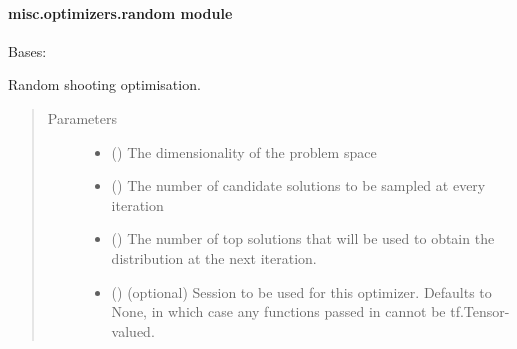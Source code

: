 \documentclass[letterpaper,10pt,english,openany,oneside]{sphinxmanual}
\begin{document}
\paragraph{misc.optimizers.random module}
\label{\detokenize{_modules/misc.optimizers:module-misc.optimizers.random}}\label{\detokenize{_modules/misc.optimizers:misc-optimizers-random-module}}

\begin{fulllineitems}
\label{\detokenize{_modules/misc.optimizers:misc.optimizers.random.RandomOptimizer}}
Bases: {\hyperref[\detokenize{_modules/misc.optimizers:misc.optimizers.optimizer.Optimizer}]{}}

Random shooting optimisation.
\begin{quote}\begin{description}
\item[{Parameters}] \leavevmode\begin{itemize}
\item {} 
 () \textendash{} The dimensionality of the problem space

\item {} 
 () \textendash{} The number of candidate solutions to be sampled at every iteration

\item {} 
 () \textendash{} The number of top solutions that will be used to obtain the distribution
at the next iteration.

\item {} 
 () \textendash{} (optional) Session to be used for this optimizer. Defaults to None,
in which case any functions passed in cannot be tf.Tensor-valued.


\end{itemize}
\end{description}
\end{quote}
\end{fulllineitems}
\end{document}
